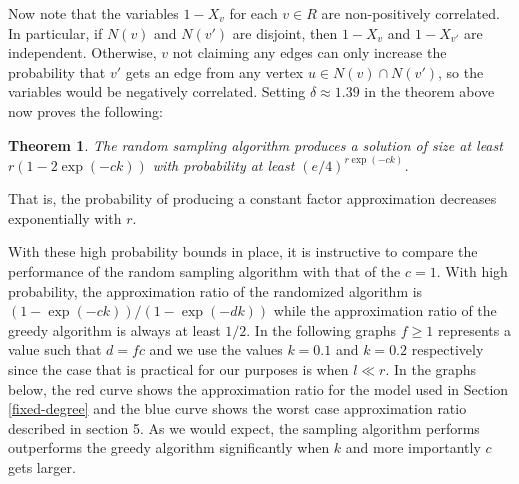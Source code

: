 \documentclass[]{article}
\newtheorem{thm}{Theorem}
\begin{document}
Now note that the variables $1-X_v$ for each $v\in R$ are
non-positively correlated. In particular, if $N(v)$ and $N(v')$ are
disjoint, then $1-X_v$ and $1-X_{v'}$ are independent. Otherwise, $v$
not claiming any edges can only increase the probability that $v'$
gets an edge from any vertex $u\in N(v)\cap N(v')$, so the variables
would be negatively correlated. Setting $\delta\approx 1.39$ in the
theorem above now proves the following:

\begin{thm}
The random sampling algorithm produces a solution of size at least $r(1-2\exp(-ck))$ with probability at least $(e/4)^{r\exp(-ck)}$.
\end{thm}

That is, the probability of producing a constant factor approximation decreases exponentially with $r$.

With these high probability bounds in place, it is instructive to
compare the performance of the random sampling algorithm with that of
the $c=1$. With high probability, the approximation ratio of the
randomized algorithm is $(1-\exp(-ck))/(1-\exp(-dk))$ while the
approximation ratio of the greedy algorithm is always at least
$1/2$. In the following graphs $f\geq 1$ represents a value such that
$d=fc$ and we use the values $k=0.1$ and $k=0.2$ respectively since
the case that is practical for our purposes is when $l \ll r$. In the
graphs below, the red curve shows the approximation ratio for the
model used in Section \ref{fixed-degree} and the blue curve shows the
worst case approximation ratio described in section 5. As we would
expect, the sampling algorithm performs outperforms the greedy
algorithm significantly when $k$ and more importantly $c$ gets larger.
\end{document}

